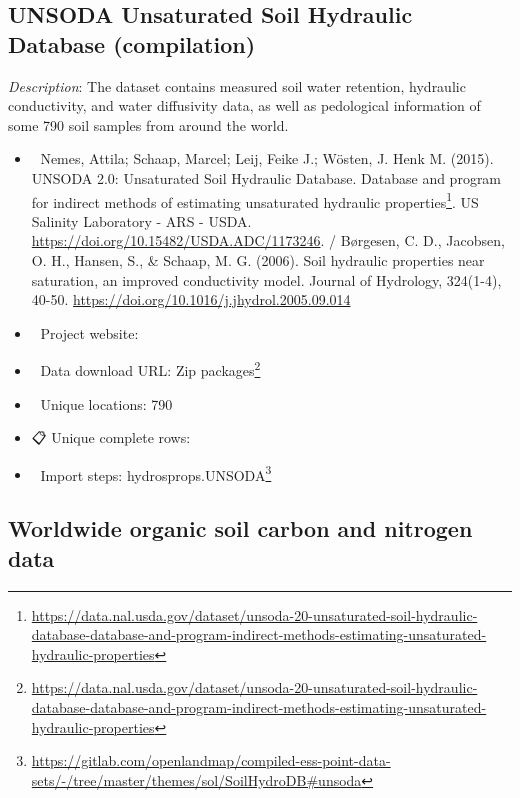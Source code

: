 \documentclass[
  graybox,natbib,nospthms]{svmono}
\providecommand{\tightlist}{%
  \setlength{\itemsep}{0pt}\setlength{\parskip}{0pt}}
\providecommand{\tightlist}{\setlength{\itemsep}{0pt}\setlength{\parskip}{0pt}}
\renewcommand{\href}[2]{#2 (\url{#1})}
\renewcommand{\href}[2]{#2\footnote{\url{#1}}}
\begin{document}
\hypertarget{unsoda-unsaturated-soil-hydraulic-database-compilation}{%
\subsection{UNSODA Unsaturated Soil Hydraulic Database (compilation)}\label{unsoda-unsaturated-soil-hydraulic-database-compilation}}

\emph{Description}: The dataset contains measured soil water retention, hydraulic conductivity, and water diffusivity data, as well as pedological information of some 790 soil samples from around the world.

\begin{itemize}
\tightlist
\item
  📕 Nemes, Attila; Schaap, Marcel; Leij, Feike J.; Wösten, J. Henk M.
  (2015). \href{https://data.nal.usda.gov/dataset/unsoda-20-unsaturated-soil-hydraulic-database-database-and-program-indirect-methods-estimating-unsaturated-hydraulic-properties}{UNSODA 2.0: Unsaturated Soil Hydraulic Database. Database and program for indirect methods of estimating unsaturated hydraulic properties}. US Salinity Laboratory - ARS - USDA. \url{https://doi.org/10.15482/USDA.ADC/1173246}. / Børgesen, C. D., Jacobsen, O. H., Hansen, S., \& Schaap, M. G. (2006). Soil hydraulic properties near saturation, an improved conductivity model. Journal of Hydrology, 324(1-4), 40-50. \url{https://doi.org/10.1016/j.jhydrol.2005.09.014}
\item
  🔗 Project website:\\
\item
  📂 Data download URL: \href{https://data.nal.usda.gov/dataset/unsoda-20-unsaturated-soil-hydraulic-database-database-and-program-indirect-methods-estimating-unsaturated-hydraulic-properties}{Zip packages}\\
\item
  📍 Unique locations: 790\\
\item
  📋 Unique complete rows:\\
\item
  📝 Import steps: \href{https://gitlab.com/openlandmap/compiled-ess-point-data-sets/-/tree/master/themes/sol/SoilHydroDB\#unsoda}{hydrosprops.UNSODA}
\end{itemize}

\hypertarget{worldwide-organic-soil-carbon-and-nitrogen-data}{%
\subsection{Worldwide organic soil carbon and nitrogen data}\label{worldwide-organic-soil-carbon-and-nitrogen-data}}
\end{document}
